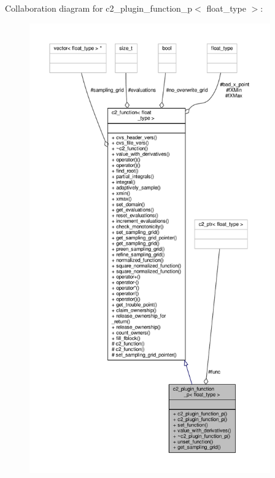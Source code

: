 Collaboration diagram for c2\+\_\+plugin\+\_\+function\+\_\+p$<$ float\+\_\+type $>$\+:
\nopagebreak
\begin{figure}[H]
\begin{center}
\leavevmode
\includegraphics[height=550pt]{classc2__plugin__function__p__coll__graph}
\end{center}
\end{figure}
